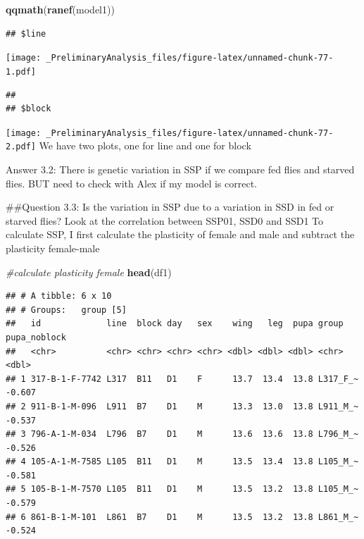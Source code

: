 \documentclass[
]{article}
\newenvironment{Shaded}{\begin{snugshade}}{\end{snugshade}}
\newcommand{\CommentTok}[1]{\textcolor[rgb]{0.56,0.35,0.01}{\textit{#1}}}
\newcommand{\KeywordTok}[1]{\textcolor[rgb]{0.13,0.29,0.53}{\textbf{#1}}}
\newcommand{\NormalTok}[1]{#1}
\begin{document}
\begin{Shaded}
\begin{Highlighting}[]
\KeywordTok{qqmath}\NormalTok{(}\KeywordTok{ranef}\NormalTok{(model1))}
\end{Highlighting}
\end{Shaded}

\begin{verbatim}
## $line
\end{verbatim}

\texttt{[image: \_PreliminaryAnalysis\_files/figure-latex/unnamed-chunk-77-1.pdf]}

\begin{verbatim}
## 
## $block
\end{verbatim}

\texttt{[image: \_PreliminaryAnalysis\_files/figure-latex/unnamed-chunk-77-2.pdf]}
We have two plots, one for line and one for block

Answer 3.2: There is genetic variation in SSP if we compare fed flies
and starved flies. BUT need to check with Alex if my model is correct.

\#\#Question 3.3: Is the variation in SSP due to a variation in SSD in
fed or starved flies? Look at the correlation between SSP01, SSD0 and
SSD1 To calculate SSP, I first calculate the plasticity of female and
male and subtract the plasticity female-male

\begin{Shaded}
\begin{Highlighting}[]
\CommentTok{#calculate plasticity female}
\KeywordTok{head}\NormalTok{(df1)}
\end{Highlighting}
\end{Shaded}

\begin{verbatim}
## # A tibble: 6 x 10
## # Groups:   group [5]
##   id             line  block day   sex    wing   leg  pupa group    pupa_noblock
##   <chr>          <chr> <chr> <chr> <chr> <dbl> <dbl> <dbl> <chr>           <dbl>
## 1 317-B-1-F-7742 L317  B11   D1    F      13.7  13.4  13.8 L317_F_~       -0.607
## 2 911-B-1-M-096  L911  B7    D1    M      13.3  13.0  13.8 L911_M_~       -0.537
## 3 796-A-1-M-034  L796  B7    D1    M      13.6  13.6  13.8 L796_M_~       -0.526
## 4 105-A-1-M-7585 L105  B11   D1    M      13.5  13.4  13.8 L105_M_~       -0.581
## 5 105-B-1-M-7570 L105  B11   D1    M      13.5  13.2  13.8 L105_M_~       -0.579
## 6 861-B-1-M-101  L861  B7    D1    M      13.5  13.2  13.8 L861_M_~       -0.524
\end{verbatim}
\end{document}
